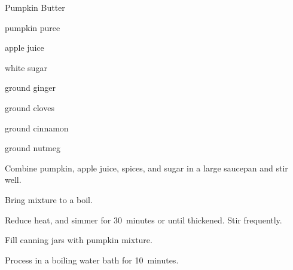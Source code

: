 \begin{recipe}{Pumpkin Butter}{}{}

\begin{ingredients}
\item \C{3\threequarter} pumpkin puree
\item \C{\threequarter} apple juice
\item \C{1\half} white sugar
\item {} ground ginger
\item \tp{\half} ground cloves
\item {} ground cinnamon
\item {} ground nutmeg
\end{ingredients}

\begin{directions}
\item Combine pumpkin, apple juice, spices, and sugar in a large saucepan and stir well.
\item Bring mixture to a boil. 
\item Reduce heat, and simmer for 30~minutes or until thickened. Stir frequently.
\item Fill canning jars with pumpkin mixture.
\item Process in a boiling water bath for 10~minutes.
\end{directions}
\end{recipe}
